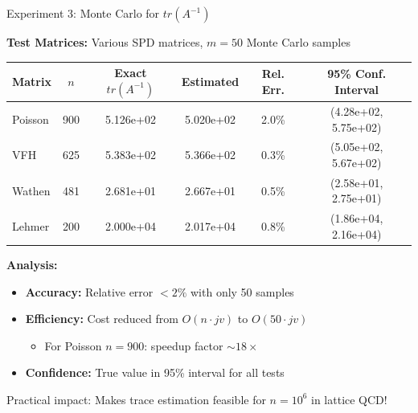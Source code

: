 \documentclass[aspectratio=169, 12pt]{beamer}
\begin{document}
\begin{frame}{Experiment 3: Monte Carlo for \(tr(A^{-1})\)}

\textbf{Test Matrices:} Various SPD matrices, \(m = 50\) Monte Carlo samples

\vspace{0.2cm}

\begin{center}
\begin{tabular}{|l|c|c|c|c|c|}
\hline
Matrix & \(n\) & Exact \(tr(A^{-1})\) & Estimated & Rel. Err. & 95\% Conf. Interval \\
\hline
Poisson & 900 & 5.126e+02 & 5.020e+02 & 2.0\% & (4.28e+02, 5.75e+02) \\
VFH & 625 & 5.383e+02 & 5.366e+02 & 0.3\% & (5.05e+02, 5.67e+02) \\
Wathen & 481 & 2.681e+01 & 2.667e+01 & 0.5\% & (2.58e+01, 2.75e+01) \\
Lehmer & 200 & 2.000e+04 & 2.017e+04 & 0.8\% & (1.86e+04, 2.16e+04) \\
\hline
\end{tabular}
\end{center}

\vspace{0.3cm}

\textbf{Analysis:}
\begin{itemize}
    \item \textbf{Accuracy:} Relative error \(< 2\%\) with only 50 samples
    \item \textbf{Efficiency:} Cost reduced from \(O(n \cdot jv)\) to \(O(50 \cdot jv)\)
    \begin{itemize}
        \item For Poisson \(n=900\): speedup factor \(\sim 18\times\)
    \end{itemize}
    \item \textbf{Confidence:} True value in 95\% interval for all tests
\end{itemize}

\vspace{0.2cm}

\alert{Practical impact:} Makes trace estimation feasible for \(n = 10^6\) in lattice QCD!

\end{frame}
\end{document}
